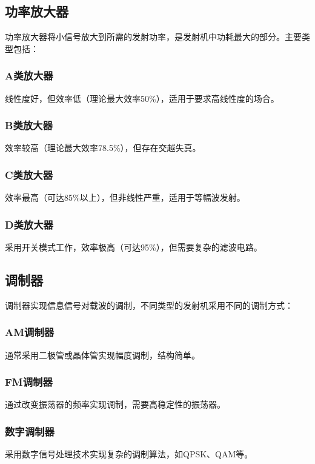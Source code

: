 \documentclass[12pt,UTF8]{ctexbook}
\begin{document}
\subsection{功率放大器}

功率放大器将小信号放大到所需的发射功率，是发射机中功耗最大的部分。主要类型包括：

\subsubsection{A类放大器}
线性度好，但效率低（理论最大效率50\%），适用于要求高线性度的场合。

\subsubsection{B类放大器}
效率较高（理论最大效率78.5\%），但存在交越失真。

\subsubsection{C类放大器}
效率最高（可达85\%以上），但非线性严重，适用于等幅波发射。

\subsubsection{D类放大器}
采用开关模式工作，效率极高（可达95\%），但需要复杂的滤波电路。

\subsection{调制器}

调制器实现信息信号对载波的调制，不同类型的发射机采用不同的调制方式：

\subsubsection{AM调制器}
通常采用二极管或晶体管实现幅度调制，结构简单。

\subsubsection{FM调制器}
通过改变振荡器的频率实现调制，需要高稳定性的振荡器。

\subsubsection{数字调制器}
采用数字信号处理技术实现复杂的调制算法，如QPSK、QAM等。
\end{document}
